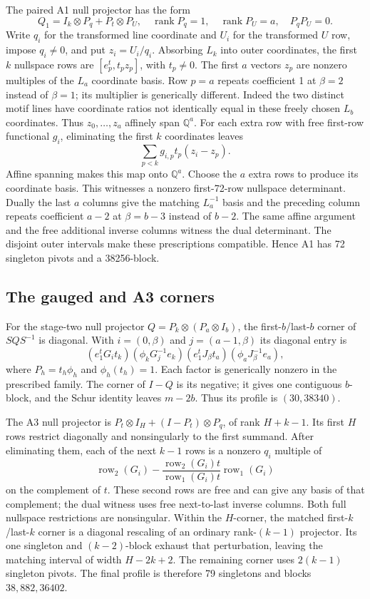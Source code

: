 The paired A1 null projector has the form
\[
 Q_1=I_k\otimes P_q+P_t\otimes P_U,\quad
 \operatorname{rank}P_q=1,\quad\operatorname{rank}P_U=a,\quad P_qP_U=0.
\]
Write $q_i$ for the transformed line coordinate and $U_i$ for the
transformed $U$ row, impose $q_i\ne0$, and put $z_i=U_i/q_i$.
Absorbing $L_k$ into outer coordinates, the first $k$ nullspace rows are
$[e_p^t,t_pz_p]$, with $t_p\ne0$. The first $a$ vectors $z_p$ are
nonzero multiples of the $L_a$ coordinate basis. Row $p=a$ repeats
coefficient 1 at $\beta=2$ instead of $\beta=1$; its multiplier is
generically different. Indeed the two distinct motif lines have
coordinate ratios not identically equal in these freely chosen
$L_b$ coordinates. Thus $z_0,\ldots,z_a$ affinely span $\mathbb Q^a$.
For each extra row with free first-row functional $g_i$, eliminating
the first $k$ coordinates leaves
\[
 \sum_{p<k}g_{i,p}t_p(z_i-z_p).
\]
Affine spanning makes this map onto $\mathbb Q^a$. Choose the $a$
extra rows to produce its coordinate basis. This witnesses a nonzero
first-72-row nullspace determinant. Dually the last $a$ columns give
the matching $L_a^{-1}$ basis and the preceding column repeats
coefficient $a-2$ at $\beta=b-3$ instead of $b-2$. The same affine
argument and the free additional inverse columns witness the dual
determinant. The disjoint outer intervals make these prescriptions
compatible. Hence A1 has 72 singleton pivots and a 38256-block.

\subsection{The gauged and A3 corners}
For the stage-two null projector $Q=P_k\otimes(P_a\otimes I_b)$,
the first-$b$/last-$b$ corner of $SQS^{-1}$ is diagonal. With
$i=(0,\beta)$ and $j=(a-1,\beta)$ its diagonal entry is
\[
(e_1^tG_it_k)(\phi_kG_j^{-1}e_k)
(e_1^tJ_\beta t_a)(\phi_aJ_\beta^{-1}e_a),
\]
where $P_h=t_h\phi_h$ and $\phi_h(t_h)=1$.
Each factor is generically nonzero in the prescribed family.
The corner of $I-Q$ is its negative; it gives one contiguous $b$-block,
and the Schur identity leaves $m-2b$. Thus its profile is $(30,38340)$.

The A3 null projector is
$P_t\otimes I_H+(I-P_t)\otimes P_q$, of rank $H+k-1$.
Its first $H$ rows restrict diagonally and nonsingularly to the first
summand. After eliminating them, each of the next $k-1$ rows is a
nonzero $q_i$ multiple of
\[
 \operatorname{row}_2(G_i)
 -\frac{\operatorname{row}_2(G_i)t}{\operatorname{row}_1(G_i)t}
       \operatorname{row}_1(G_i)
\]
on the complement of $t$. These second rows are free and can give
any basis of that complement; the dual witness uses free next-to-last
inverse columns. Both full nullspace restrictions are nonsingular.
Within the $H$-corner, the matched first-$k$/last-$k$ corner is a
diagonal rescaling of an ordinary rank-$(k-1)$ projector. Its one
singleton and $(k-2)$-block exhaust that perturbation, leaving the
matching interval of width $H-2k+2$. The remaining corner uses
$2(k-1)$ singleton pivots. The final profile is therefore 79 singletons
and blocks $38,882,36402$.

